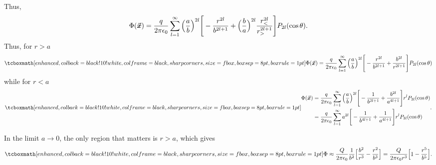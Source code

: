{Thus,
\begin{eqnarray}
    \Phi(\va*{x}) = \frac{q}{2 \pi \epsilon_0} \sum_{l=1}^{\infty} \Big( \frac{a}{b} \Big)^{2l} \Bigg[ -\frac{r^{2l}}{b^{2l+1}} + \Big( \frac{b}{a} \Big)^{2l} \frac{r_{<}^{2l}}{r_{>}^{2l+1}} \Bigg] P_{2l}(\cos{\theta})
.\end{eqnarray}
Thus, for $r > a$
\begin{eqnarray}
    \eqbox{ \Phi(\va*{x}) = \frac{q}{2 \pi \epsilon_0} \sum_{l=1}^{\infty} \Big( \frac{a}{b} \Big)^{2l} \Bigg[ -\frac{r^{2l}}{b^{2l+1}} + \frac{b^{2l}}{r^{2l+1}} \Bigg] P_{2l}(\cos{\theta}) }
\end{eqnarray}
while for $r < a$
\begin{eqnarray}
    \eqbox{
    \begin{aligned}
        \Phi(\va*{x}) &= \frac{q}{2 \pi \epsilon_0} \sum_{l=1}^{\infty} \Big( \frac{a}{b} \Big)^{2l} \Bigg[ -\frac{1}{b^{2l+1}} + \frac{b^{2l}}{a^{4l+1}} \Bigg] r^{l} P_{2l}(\cos{\theta}) \\
                      &= \frac{q}{2 \pi \epsilon_0} \sum_{l=1}^{\infty} a^{2l} \Bigg[ -\frac{1}{b^{4l+1}} + \frac{1}{a^{4l+1}} \Bigg] r^{l} P_{2l}(\cos{\theta}) \\
    \end{aligned}
}
.\end{eqnarray}

In the limit $a \rightarrow 0$, the only region that matters is $r > a$, which gives
\begin{eqnarray}
    \eqbox{ \Phi \approx \frac{Q}{2\pi\epsilon_0} \frac{1}{b^2} \Big[ \frac{b^{2}}{r^{3}} - \frac{r^{2}}{b^{3}} \Big] = \frac{Q}{2\pi\epsilon_0 r^3} \Big[ 1 - \frac{r^{5}}{b^{5}} \Big] }
.\end{eqnarray}

}




